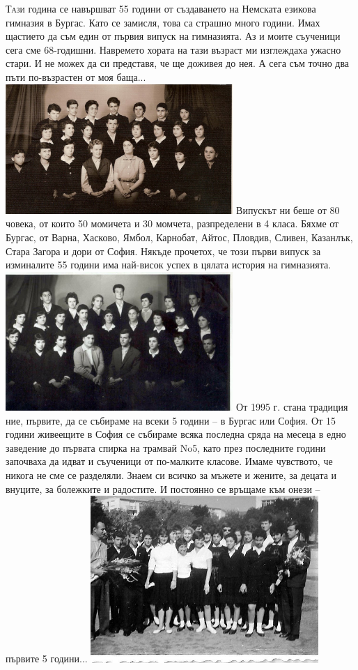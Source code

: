 \begin{multicols}{2}

\noindent \lettrine[lraise=0.2, nindent=0em, slope=-.5em]{Т}{ази} година се навършват 55 години от създаването на Немската езикова гимназия в 
Бургас. Като се замисля, това са страшно много години. Имах щастието да съм един 
от първия випуск на гимназията. Аз и моите съученици сега сме 68-годишни. 
Навремето хората на тази възраст ми изглеждаха ужасно стари. И не можех да си 
представя, че ще доживея до нея. А сега съм точно два пъти по-възрастен от моя 
баща...
\includegraphics[width=3.4in]{./zdravei_az/2-1.jpg}
Випускът ни беше от 80 човека, от които 50 момичета и 30 момчета, разпределени в 
4 класа. Бяхме от Бургас, от Варна, Хасково, Ямбол, Карнобат, Айтос, Пловдив, 
Сливен, Казанлък, Стара Загора и дори от София. Някъде прочетох, че този първи 
випуск за изминалите 55 години има най-висок успех в цялата история на 
гимназията.
\includegraphics[width=3.4in]{./zdravei_az/2-2.jpg}
От 1995 г. стана традиция ние, първите, да се събираме на всеки 5 години – в 
Бургас или София. От 15 години живеещите в София се събираме всяка последна 
сряда на месеца в едно заведение до първата спирка на трамвай No5, като през 
последните години започваха да идват и съученици от по-малките класове. Имаме 
чувството, че никога не сме се разделяли. Знаем си всичко за мъжете и жените, за 
децата и внуците, за болежките и радостите. И постоянно се връщаме към онези – 
първите 5 години...
\includegraphics[width=3.4in]{./zdravei_az/2-3.jpg}

\end{multicols}
